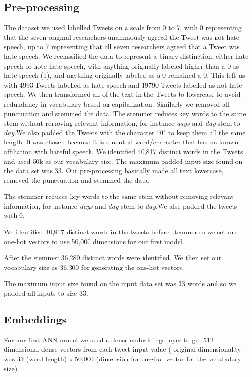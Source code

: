 \documentclass[conference]{sig-alternate-05-2015}
\begin{document}
\subsection{Pre-processing}
The dataset we used labelled Tweets on a scale from 0 to 7, with 0 representing that the seven original researchers unanimously agreed the Tweet was not hate speech, up to 7 representing that all seven researchers agreed that a Tweet was hate speech. We reclassified the data to represent a binary distinction, either hate speech or note hate speech, with anything originally labeled higher than a 0 as hate speech (1), and anything originally labeled as a 0 remained a 0. This left us with 4993 Tweets labelled as hate speech and 19790 Tweets labelled as not hate speech. We then transformed all of the text in the Tweets to lowercase to avoid redundancy in vocabulary based on capitalization. Similarly we removed all punctuation and stemmed the data. The stemmer reduces key words to the same stem without removing relevant information, for instance \textit{days} and \textit{day} stem to \textit{day}.We also padded the Tweets with the character ``0" to keep them all the same length. 0 was chosen because it is a neutral word/character that has no known affiliation with hateful speech.
We identified 40,817 distinct words in the Tweets and used 50k as our vocabulary size.
The maximum padded input size found on the data set was 33. 
Our pre-processing basically made all text lowercase, removed the punctuation and stemmed the data.

The stemmer reduces key words to the same stem without removing relevant information, for instance \textit{days} and \textit{day} stem to \textit{day}.We also padded the tweets with 0.

We identified 40,817 distinct words in the tweets before stemmer.so we set our one-hot vectors to use 50,000 dimensions for our first model.

After the stemmer  36,280 distinct words were identified. We then set our vocabulary size as 36,300 for generating the one-hot vectors.

The maximum input size found on the input data set was 33 words and so we padded all inputs to size 33.

\subsection{Embeddings}
For our first ANN model we used a dense embeddings layer to get 512 dimensional dense vectors from each tweet input value ( original dimensionality was 33 (word length) x 50,000 (dimension for one-hot vector for the vocabulary size).
\end{document}
